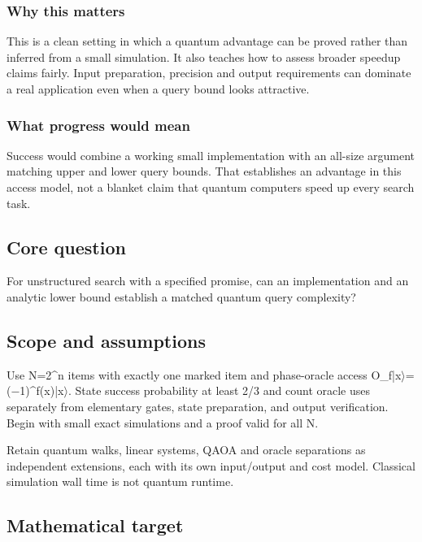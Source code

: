 \documentclass[
  11pt,
]{article}
\begin{document}
\subsubsection{Why this matters}

This is a clean setting in which a quantum advantage can be proved
rather than inferred from a small simulation. It also teaches how to
assess broader speedup claims fairly. Input preparation, precision and
output requirements can dominate a real application even when a query
bound looks attractive.

\subsubsection{What progress would mean}

Success would combine a working small implementation with an all-size
argument matching upper and lower query bounds. That establishes an
advantage in this access model, not a blanket claim that quantum
computers speed up every search task.

\subsection{Core question}

For unstructured search with a specified promise, can an implementation
and an analytic lower bound establish a matched quantum query
complexity?

\subsection{Scope and assumptions}

Use N=2\^{}n items with exactly one marked item and phase-oracle access
O\_f|x\ensuremath{\rangle}=(\ensuremath{-}1)\textasciicircum{}f(x)|x\ensuremath{\rangle}.
State success probability at least 2/3 and count oracle uses separately
from elementary gates, state preparation, and output verification. Begin
with small exact simulations and a proof valid for all N.

Retain quantum walks, linear systems, QAOA and oracle separations as
independent extensions, each with its own input/output and cost model.
Classical simulation wall time is not quantum runtime.

\subsection{Mathematical target}
\end{document}
